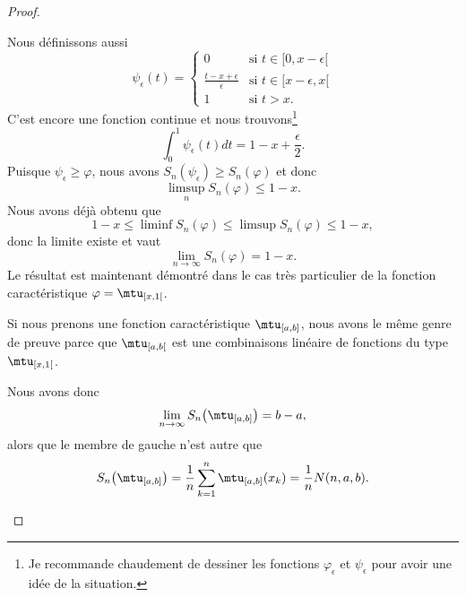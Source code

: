 \begin{proof}
\begin{subproof}
		Nous définissons aussi
		\begin{equation}
			\psi_{\epsilon}(t)=\begin{cases}
				0                                 & \text{si } t\in \mathopen[ 0 , x-\epsilon [ \\
				\frac{ t-x+\epsilon }{ \epsilon } & \text{si } t\in\mathopen[ x-\epsilon , x [  \\
				1                                 & \text{si } t>x.
			\end{cases}
		\end{equation}
		C'est encore une fonction continue et nous trouvons\footnote{Je recommande chaudement de dessiner les fonctions \( \varphi_{\epsilon}\) et \( \psi_{\epsilon}\) pour avoir une idée de la situation.}
		\begin{equation}
			\int_0^1\psi_{\epsilon}(t)dt=1-x+\frac{ \epsilon }{2}.
		\end{equation}
		Puisque \( \psi_{\epsilon}\geq\varphi\), nous avons \( S_n(\psi_{\epsilon})\geq S_n(\varphi)\) et donc
		\begin{equation}
			\limsup_{n}S_n(\varphi)\leq 1-x.
		\end{equation}
		Nous avons déjà obtenu que
		\begin{equation}
			1-x\leq\liminf S_n(\varphi)\leq \limsup S_n(\varphi)\leq 1-x,
		\end{equation}
		donc la limite existe et vaut
		\begin{equation}
			\lim_{n\to \infty} S_n(\varphi)=1-x.
		\end{equation}
		Le résultat est maintenant démontré dans le cas très particulier de la fonction caractéristique \( \varphi=\mtu_{\mathopen[ x , 1 [}\).

		Si nous prenons une fonction caractéristique \( \mtu_{\mathopen[ a , b \mathclose]}\), nous avons le même genre de preuve parce que \( \mtu_{\mathopen[ a , b [}\) est une combinaisons linéaire de fonctions du type \( \mtu_{\mathopen[ x , 1 [}\).

		Nous avons donc
		\begin{equation}
			\lim_{n\to \infty} S_n\big( \mtu_{\mathopen[ a , b \mathclose]} \big)=b-a,
		\end{equation}
		alors que le membre de gauche n'est autre que
		\begin{equation}
			S_n\big( \mtu_{\mathopen[ a , b \mathclose]} \big)=\frac{1}{ n }\sum_{k=1}^n\mtu_{\mathopen[ a , b \mathclose]}(x_k)=\frac{1}{ n }N(n,a,b).
		\end{equation}


\end{subproof}
\end{proof}
